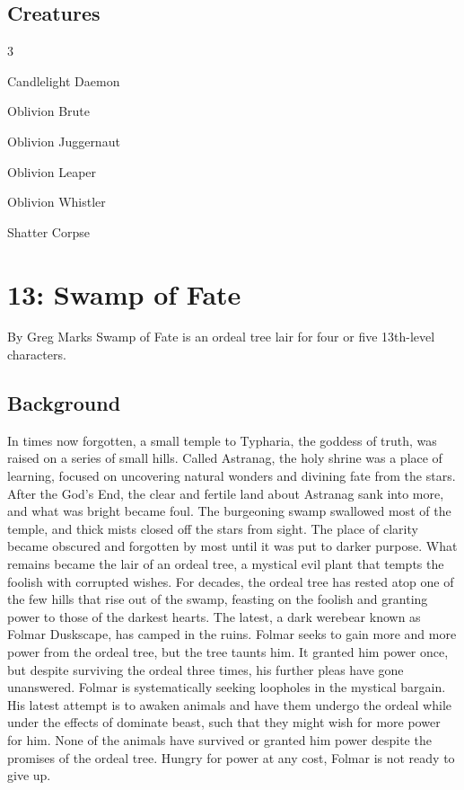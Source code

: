 \documentclass[10pt,a4paper,twoside,twocolumn,openany,bg=print,nodeprecatedcode]{dndbook}
\begin{document}
\section{Creatures}

\begin{itemize}
\begin{multicols}{3}
\item Candlelight Daemon
\item Oblivion Brute
\item Oblivion Juggernaut
\item Oblivion Leaper
\item Oblivion Whistler
\item Shatter Corpse
\end{multicols}

\end{itemize}

\chapter{13: Swamp of Fate}
By Greg Marks
Swamp of Fate is an ordeal tree lair for four or five 13th-level characters.
\section{Background}
In times now forgotten, a small temple to Typharia, the goddess of truth, was raised on a series of small hills. Called Astranag, the holy shrine was a place of learning, focused on uncovering natural wonders and divining fate from the stars. After the God's End, the clear and fertile land about Astranag sank into more, and what was bright became foul. The burgeoning swamp swallowed most of the temple, and thick mists closed off the stars from sight. The place of clarity became obscured and forgotten by most until it was put to darker purpose.
What remains became the lair of an ordeal tree, a mystical evil plant that tempts the foolish with corrupted wishes. For decades, the ordeal tree has rested atop one of the few hills that rise out of the swamp, feasting on the foolish and granting power to those of the darkest hearts. The latest, a dark werebear known as Folmar Duskscape, has camped in the ruins. Folmar seeks to gain more and more power from the ordeal tree, but the tree taunts him. It granted him power once, but despite surviving the ordeal three times, his further pleas have gone unanswered. Folmar is systematically seeking loopholes in the mystical bargain.
His latest attempt is to awaken animals and have them undergo the ordeal while under the effects of dominate beast, such that they might wish for more power for him. None of the animals have survived or granted him power despite the promises of the ordeal tree. Hungry for power at any cost, Folmar is not ready to give up.
\end{document}
